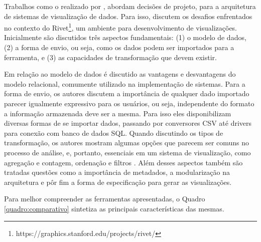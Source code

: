 Trabalhos como o realizado por , abordam decisões de projeto, para a 
arquitetura de sistemas de visualização de dados. Para isso,  discutem 
os desafios enfrentados no contexto do Rivet\footnote{https://graphics.stanford.edu/projects/rivet/}, 
um ambiente para desenvolvimento de visualizações. Inicialmente são discutidos três aspectos 
fundamentais: (1) o modelo de dados, (2) a forma de envio, ou seja, como os dados podem ser 
importados para a ferramenta, e (3) as capacidades de transformação que devem existir. 

Em relação ao modelo de dados é discutido as vantagens e desvantagens do modelo relacional, 
comumente utilizado na implementação de sistemas. Para a forma de envio, os autores discutem 
a importância de qualquer dado importado parecer igualmente expressivo para os usuários, ou 
seja, independente do formato a informação armazenada deve ser a mesma. Para isso eles 
disponibilizam diversas formas de se importar dados, passando por conversores CSV até 
drivers para conexão com banco de dados SQL. Quando discutindo os tipos de transformação, 
os autores mostram algumas opções que parecem ser comuns no processo de análise, e, 
portanto, essenciais em um sistema de visualização, como agregação e contagem, ordenação e 
filtros \cite{tang2004}. Além desses aspectos também são tratadas questões como a 
importância de metadados, a modularização na arquitetura e pôr fim a forma de especificação 
para gerar as visualizações.

Para melhor compreender as ferramentas apresentadas, o Quadro \ref{quadro:comparativo} sintetiza as principais 
características das mesmas.

